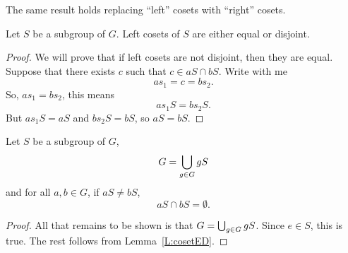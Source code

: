 \documentclass{ximera}
\begin{document}
\begin{remark}
  The same result holds replacing ``left'' cosets with ``right''
  cosets.
\end{remark}



\begin{lemma}\label{L:cosetED}
  Let $S$ be a subgroup of $G$. Left cosets of $S$ are either equal or
  disjoint.
  \begin{proof}
    We will prove that if left cosets are not disjoint, then they are
    equal. Suppose that there exists $c$ such that $c\in aS \cap
    bS$. Write with me
    \[
    as_1 = c = bs_2.
    \]
    So, $as_1 = bs_2$, this means
    \[
    as_1 S = bs_2 S.
    \]
    But $as_1S = aS$ and $bs_2 S = bS$, so $aS = bS$.
  \end{proof}
\end{lemma}



\begin{theorem}\label{T:CPG}
  Let $S$ be a subgroup of $G$, 
  \[
  G = \bigcup_{g\in G} gS
  \]
  and for all $a,b\in G$, if $aS \ne bS$,
  \[
  aS\cap bS = \emptyset.
  \]
  \begin{proof}
    All that remains to be shown is that $G = \bigcup_{g\in G}
    gS$. Since $e\in S$, this is true. The rest follows from
    Lemma~\ref{L:cosetED}.
  \end{proof}
\end{theorem}






\end{document}
